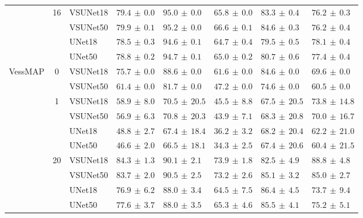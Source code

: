 \documentclass[%
reprint,
nofootinbib,
 amsmath,amssymb,
aps,
superscriptaddress,
showkeys,
longbibliography
]{revtex4-1}
\begin{document}
\begin{table}[t]
\begin{tabular}{l c l l l l l l}
         \cline{2-8}
         & \multirow{4}{*}{16} & VSUNet18 & $79.4 \,\pm\, 0.0$ & $95.0 \,\pm\, 0.0$ & $65.8 \,\pm\, 0.0$ & $83.3 \,\pm\, 0.4$ & $76.2 \,\pm\, 0.3$ \\
         &  & VSUNet50 & $\mathbf{79.9} \,\pm\, 0.1$ & $95.2 \,\pm\, 0.0$ & $66.6 \,\pm\, 0.1$ & $84.6 \,\pm\, 0.3$ & $76.2 \,\pm\, 0.4$ \\
         &  & UNet18 & $78.5 \,\pm\, 0.3$ & $94.6 \,\pm\, 0.1$ & $64.7 \,\pm\, 0.4$ & $79.5 \,\pm\, 0.5$ & $78.1 \,\pm\, 0.4$ \\
         &  & UNet50 & $78.8 \,\pm\, 0.2$ & $94.7 \,\pm\, 0.1$ & $65.0 \,\pm\, 0.2$ & $80.7 \,\pm\, 0.6$ & $77.4 \,\pm\, 0.4$ \\
        \hline
        \multirow{10}{*}{VessMAP} & \multirow{2}{*}{0} & VSUNet18 & $\mathbf{75.7} \,\pm\, 0.0$ & $88.6 \,\pm\, 0.0$ & $61.6 \,\pm\, 0.0$ & $84.6 \,\pm\, 0.0$ & $69.6 \,\pm\, 0.0$ \\
         &  & VSUNet50 & $61.4 \,\pm\, 0.0$ & $81.7 \,\pm\, 0.0$ & $47.2 \,\pm\, 0.0$ & $74.6 \,\pm\, 0.0$ & $60.5 \,\pm\, 0.0$ \\
         \cline{2-8}
         & \multirow{4}{*}{1} & VSUNet18 & $\mathbf{58.9} \,\pm\, 8.0$ & $70.5 \,\pm\, 20.5$ & $45.5 \,\pm\, 8.8$ & $67.5 \,\pm\, 20.5$ & $73.8 \,\pm\, 14.8$ \\
         &  & VSUNet50 & $56.9 \,\pm\, 6.3$ & $70.8 \,\pm\, 20.3$ & $43.9 \,\pm\, 7.1$ & $68.3 \,\pm\, 20.8$ & $70.0 \,\pm\, 16.7$ \\
         &  & UNet18 & $48.8 \,\pm\, 2.7$ & $67.4 \,\pm\, 18.4$ & $36.2 \,\pm\, 3.2$ & $68.2 \,\pm\, 20.4$ & $62.2 \,\pm\, 21.0$ \\
         &  & UNet50 & $46.6 \,\pm\, 2.0$ & $66.5 \,\pm\, 18.1$ & $34.3 \,\pm\, 2.5$ & $67.4 \,\pm\, 20.6$ & $60.4 \,\pm\, 21.5$ \\
         \cline{2-8}
         & \multirow{4}{*}{20} & VSUNet18 & $\mathbf{84.3} \,\pm\, 1.3$ & $90.1 \,\pm\, 2.1$ & $73.9 \,\pm\, 1.8$ & $82.5 \,\pm\, 4.9$ & $88.8 \,\pm\, 4.8$ \\
         &  & VSUNet50 & $83.7 \,\pm\, 2.0$ & $90.5 \,\pm\, 2.5$ & $73.2 \,\pm\, 2.6$ & $85.1 \,\pm\, 3.2$ & $85.0 \,\pm\, 2.7$ \\
         &  & UNet18 & $76.9 \,\pm\, 6.2$ & $88.0 \,\pm\, 3.4$ & $64.5 \,\pm\, 7.5$ & $86.4 \,\pm\, 4.5$ & $73.7 \,\pm\, 9.4$ \\
         &  & UNet50 & $77.6 \,\pm\, 3.7$ & $88.0 \,\pm\, 3.5$ & $65.3 \,\pm\, 4.6$ & $85.5 \,\pm\, 4.1$ & $75.2 \,\pm\, 5.1$ \\
        \hline
    \end{tabular}
    \endgroup
\end{table}
\end{document}
